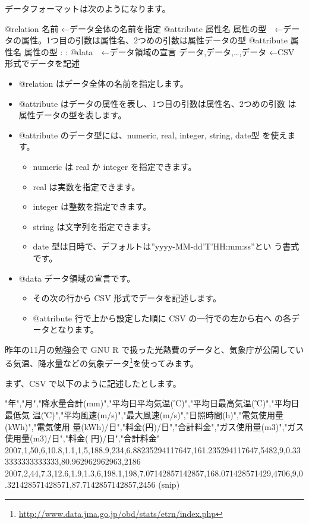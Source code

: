\documentclass[mingoth,a4paper]{jsarticle}
\begin{document}
データフォーマットは次のようになります。

\begin{commandline}
@relation 名前 ←データ全体の名前を指定
@attribute 属性名 属性の型　←データの属性。1つ目の引数は属性名、2つめの引数は属性データの型
@attribute 属性名 属性の型
:
:
@data　←データ領域の宣言
データ,データ,…,データ ←CSV 形式でデータを記述
\end{commandline}

\begin{itemize}
\item @relation はデータ全体の名前を指定します。
\item @attribute はデータの属性を表し、1つ目の引数は属性名、2つめの引数
      は属性データの型を表します。
\item @attribute のデータ型には、numeric, real, integer, string, date型
      を使えます。
      \begin{itemize}
       \item numeric は real か integer を指定できます。
       \item real は実数を指定できます。
       \item integer は整数を指定できます。
       \item string は文字列を指定できます。
       \item date 型は日時で、デフォルトは''yyyy-MM-dd'T'HH:mm:ss''とい
	     う書式です。
      \end{itemize}
 \item @data データ領域の宣言です。
       \begin{itemize}
	\item その次の行から CSV 形式でデータを記述します。
	\item @attribute 行で上から設定した順に CSV の一行での左から右へ
	      の各データとなります。
       \end{itemize}
\end{itemize}

昨年の11月の勉強会で GNU R で扱った光熱費のデータと、気象庁が公開してい
る気温、降水量などの気象データ\footnote{\url{http://www.data.jma.go.jp/obd/stats/etrn/index.php}}を使ってみます。

まず、CSV で以下のように記述したとします。
\begin{commandline}
"年","月","降水量合計(mm)","平均日平均気温(℃)","平均日最高気温(℃)","平均日最低気
温(℃)","平均風速(m/s)","最大風速(m/s)","日照時間(h)","電気使用量(kWh)","電気使用
量(kWh)/日","料金(円)/日","合計料金","ガス使用量(m3)","ガス使用量(m3)/日","料金(
円)/日","合計料金"
2007,1,50,6,10.8,1.1,1,5,188.9,234,6.88235294117647,161.235294117647,5482,9,0.333333333333333,80.962962962963,2186
2007,2,44,7.3,12.6,1.9,1.3,6,198.1,198,7.07142857142857,168.071428571429,4706,9,0.321428571428571,87.7142857142857,2456
(snip)
\end{commandline}
\end{document}
